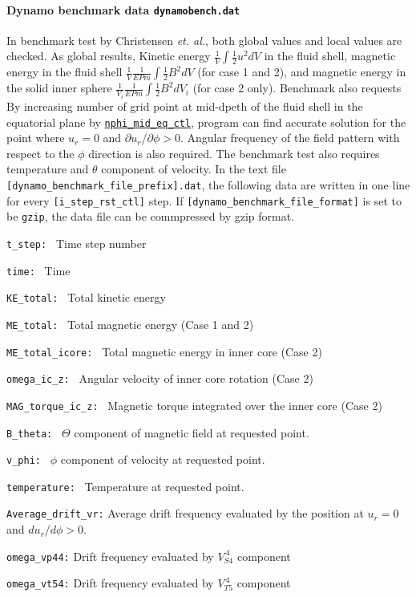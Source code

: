 \paragraph{Dynamo benchmark data {\tt dynamobench.dat}}
 In benchmark test by Christensen {\it et. al.}, both global values and local values are checked. As global results, Kinetic energy 
 $\displaystyle{ \frac{1}{V} \int \frac{1}{2} u^{2} dV}$ in the fluid shell, magnetic energy in the fluid shell 
 $\displaystyle{ \frac{1}{V} \frac{1}{E Pm} \int \frac{1}{2} B^{2} dV}$ (for case 1 and 2), and magnetic energy in the solid inner sphere 
 $\displaystyle{ \frac{1}{V_{i}} \frac{1}{E Pm} \int \frac{1}{2} B^{2} dV_{i}}$ (for case 2 only). Benchmark also requests 
 By increasing number of grid point at mid-dpeth of the fluid shell in the equatorial plane by \hyperref[href_t:nphi_mid_eq_ctl]{{\tt nphi\_mid\_eq\_ctl}}, program can find accurate solution for the point where $u_{r} = 0$ and $\partial u_{r} / \partial \phi > 0$. Angular frequency of the field pattern with respect to the $\phi$ direction is also required. The benchmark test also requires temperature and $\theta$ component of velocity. In the text file {\tt [dynamo\_benchmark\_file\_prefix].dat}, the following data are written in one line for every \verb|[i_step_rst_ctl]| step. If {\tt [dynamo\_benchmark\_file\_format]} is set to be {\tt gzip}, the data file can be commpressed by gzip format.
%
\begin{description}
\item{\tt t\_step:  }  Time step number
\item{\tt time:     }  Time
\item{\tt KE\_total: }  Total kinetic energy
\item{\tt ME\_total: }  Total magnetic energy  (Case 1 and 2)
\item{\tt ME\_total\_icore: }  Total magnetic energy in inner core (Case 2)
\item{\tt omega\_ic\_z: } Angular velocity of inner core rotation (Case 2)
\item{\tt MAG\_torque\_ic\_z: }  Magnetic torque integrated over the inner core (Case 2)
\item{\tt B\_theta: } $\Theta$ component of magnetic field at requested point.
\item{\tt v\_phi: } $\phi$ component of velocity at requested point.
\item{\tt temperature: } Temperature at requested point.
\item{\tt Average\_drift\_vr:} Average drift frequency evaluated by the position at $u_{r} = 0$ and $d u_{r} / d \phi > 0$.
\item{\tt omega\_vp44:} Drift frequency evaluated by $V_{S4}^{\ 4}$ component
\item{\tt omega\_vt54:} Drift frequency evaluated by $V_{T5}^{\ 4}$ component


\end{description}

